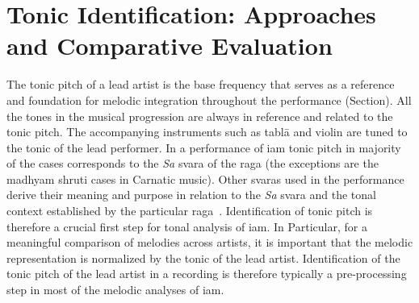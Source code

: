 
\section{Tonic Identification: Approaches and Comparative Evaluation}
\label{sec:data_preprocessing_tonic_identification}

The tonic pitch of a lead artist is the base frequency that serves as a reference and foundation for melodic integration throughout the performance (Section). All the tones in the musical progression are always in reference and related to the tonic pitch. The accompanying instruments such as tabl\={a} and violin are tuned to the tonic of the lead performer. In a performance of \gls{iam} tonic pitch in majority of the cases corresponds to the \textit{Sa} \gls{svara} of the \gls{raga} (the exceptions are the madhyam \gls{shruti} cases in Carnatic music). Other \glspl{svara} used in the performance derive their meaning and purpose in relation to the \textit{Sa} \gls{svara} and the tonal context established by the particular \gls{raga}~\citep{Danielou2010}. Identification of tonic pitch is therefore a crucial first step for tonal analysis of \gls{iam}. In Particular, for a meaningful comparison of melodies across artists, it is important that the melodic representation is normalized by the tonic of the lead artist. Identification of the tonic pitch of the lead artist in a recording is therefore typically a pre-processing step in most of the melodic analyses of \gls{iam}. 

